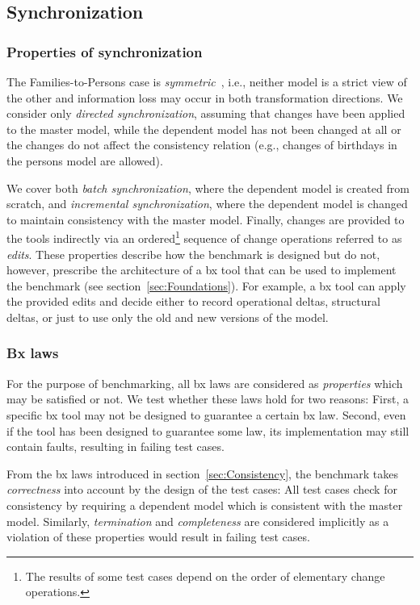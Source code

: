 \subsection{Synchronization}
\label{sec:ConsistencyRestoration}

\subsubsection{Properties of synchronization}

The Families-to-Persons case is \emph{symmetric}~\cite{Diskin2014}, i.e., neither model is a strict view of the other and information loss may occur in both transformation directions. We consider only \emph{directed synchronization}, assuming that changes have been applied to the master model, while the dependent model has not been changed at all or the changes do not affect the consistency relation (e.g., changes of birthdays in the persons model are allowed). 

We cover both \emph{batch synchronization}, where the dependent model is created from scratch, and \emph{incremental synchronization}, where the dependent model is changed to maintain consistency with the master model. 
Finally, changes are provided to the tools indirectly via an ordered\footnote{The results of some test cases depend on the order of elementary change operations.} sequence of change operations referred to as \emph{edits}.
%
These properties describe how the benchmark is designed but do not, however, prescribe the architecture of a bx tool that can be used to implement the benchmark (see section~\ref{sec:Foundations}).
For example, a bx tool can apply the provided edits and decide either to record operational deltas, structural deltas, or just to use only the old and new versions of the model.

\subsubsection{Bx laws}
\label{sec:BxLaws}

For the purpose of benchmarking, all bx laws are considered as \emph{properties} which may be satisfied or not. 
We test whether these laws hold for two reasons: First, a specific bx tool may not be designed to guarantee a certain bx law. 
Second, even if the tool has been designed to guarantee some law, its implementation may still contain faults, resulting in failing test cases.

From the bx  laws introduced in section~\ref{sec:Consistency}, the benchmark takes \emph{correctness} into account by the design of the test cases: All test cases check for consistency by requiring a dependent model which is consistent with the master model. Similarly, \emph{termination} and \emph{completeness} are considered implicitly as a violation of these properties would result in failing test cases.

